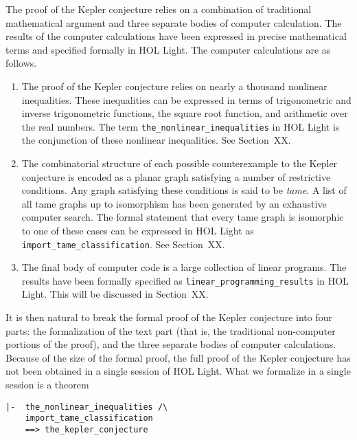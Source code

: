  The proof of the Kepler conjecture relies on a combination of traditional mathematical argument
and three separate bodies of computer calculation.   The results of the computer calculations have been expressed
in precise mathematical terms and specified formally in HOL Light.  The computer calculations are as follows.
\begin{enumerate}
\item The proof of the Kepler conjecture relies on nearly a thousand nonlinear inequalities.  These inequalities can
be expressed in terms of trigonometric and inverse trigonometric functions, the square root function, and arithmetic over
the real numbers.  The term \verb!the_nonlinear_inequalities! in HOL Light is the conjunction of these nonlinear
inequalities.  See Section~XX.
\item The combinatorial structure of each possible counterexample to the Kepler conjecture is encoded as a planar graph
satisfying a number of restrictive conditions.  Any graph satisfying these conditions is said to be {\it tame}.  A list of
all tame graphs up to isomorphism has been generated by an exhaustive computer search.  The formal statement  that every
tame graph is isomorphic to one of these cases can be expressed in HOL Light as 
\verb!import_tame_classification!.  See Section~XX.
\item The final body of computer code  is a large collection of linear programs.  The results have
been formally specified as \verb!linear_programming_results! in HOL Light.
This will be discussed in Section~XX.
\end{enumerate}

It is then natural to break the formal proof of the Kepler conjecture
into four parts: the formalization of the text part (that is, the
traditional non-computer portions of the proof), and the three
separate bodies of computer calculations.  Because of the size of the
formal proof, the full proof of the Kepler conjecture has not been
obtained in a single session of HOL Light.  What we formalize in a
single session is a theorem

\begin{obeylines}

\begin{verbatim}
|-  the_nonlinear_inequalities /\
    import_tame_classification
    ==> the_kepler_conjecture
\end{verbatim}

\end{obeylines}

